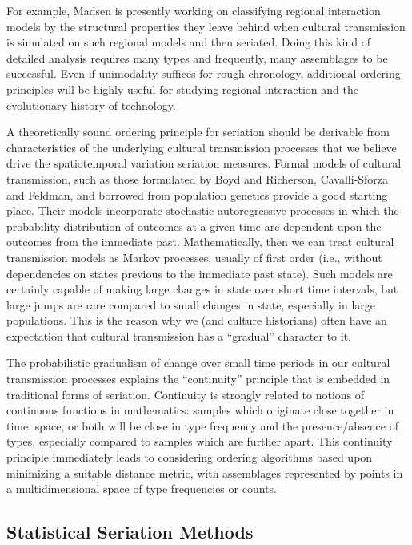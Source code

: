 For example, Madsen \citeyearpar{madsenlipo2015b} is presently working
on classifying regional interaction models by the structural properties
they leave behind when cultural transmission is simulated on such
regional models and then seriated. Doing this kind of detailed analysis
requires many types and frequently, many assemblages to be successful.
Even if unimodality suffices for rough chronology, additional ordering
principles will be highly useful for studying regional interaction and
the evolutionary history of technology.

A theoretically sound ordering principle for seriation should be
derivable from characteristics of the underlying cultural transmission
processes that we believe drive the spatiotemporal variation seriation
measures. Formal models of cultural transmission, such as those
formulated by Boyd and Richerson, Cavalli-Sforza and Feldman, and
borrowed from population genetics
\citep{Boyd1985, Cavalli-Sforza1981, Neiman1995} provide a good starting
place. Their models incorporate stochastic autoregressive processes in
which the probability distribution of outcomes at a given time are
dependent upon the outcomes from the immediate past. Mathematically,
then we can treat cultural transmission models as Markov processes,
usually of first order (i.e., without dependencies on states previous to
the immediate past state). Such models are certainly capable of making
large changes in state over short time intervals, but large jumps are
rare compared to small changes in state, especially in large
populations. This is the reason why we (and culture historians) often
have an expectation that cultural transmission has a ``gradual''
character to it.

The probabilistic gradualism of change over small time periods in our
cultural transmission processes explains the ``continuity'' principle
that is embedded in traditional forms of seriation. Continuity is
strongly related to notions of continuous functions in mathematics:
samples which originate close together in time, space, or both will be
close in type frequency and the presence/absence of types, especially
compared to samples which are further apart. This continuity principle
immediately leads to considering ordering algorithms based upon
minimizing a suitable distance metric, with assemblages represented by
points in a multidimensional space of type frequencies or counts.

\subsection{Statistical Seriation
Methods}\label{statistical-seriation-methods}

